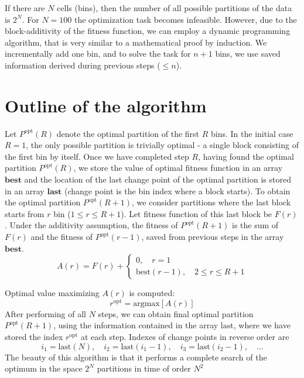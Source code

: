 \documentclass{article}
\begin{document}
If there are $N$ cells (bins), then the number of all possible partitions of the data is $2^N$. For $N=100$ the optimization task becomes infeasible. However, due to the block-additivity of the fitness function, we can employ a dynamic programming algorithm, that is very similar to a mathematical proof by induction. We incrementally add one bin, and to solve the task for $n+1$ bins, we use saved information derived during previous steps ($\le n$). 

\section{Outline of the algorithm}
Let $P^{\text{opt}}(R)$ denote the optimal partition of the first $R$ bins. In the initial case $R=1$, the only possible partition is trivially optimal - a single block consisting of the first bin by itself. Once we have completed step $R$, having found the optimal partition $P^{\text{opt}}(R)$, we store the value of optimal fitness function in an array $\textbf{best}$ and the location of the last change point of the optimal partition is stored in an array $\textbf{last}$ (change point is the bin index where a block starts). To obtain the optimal partition  $P^{\text{opt}}(R+1)$, we consider partitions where the last block starts from  $r$ bin ($1\le r \le R+1$). Let fitness function of this last block be $F(r)$. Under the additivity assumption, the fitness of   $P^{\text{opt}}(R+1)$ is the sum of  $F(r)$ and the fitness of $P^{\text{opt}}(r-1)$, saved from previous steps in the array $\textbf{best}$.
\begin{equation}
    A(r) = F(r) + \begin{cases} 0,\quad r=1\\ \text{best}(r-1), \quad 2\le r\le R+1\end{cases}
\end{equation}

Optimal value maximizing $A(r)$ is computed:
$$ r^{\text{opt}}= \text{argmax}[A(r)] $$
After performing of all $N$ steps, we can obtain final optimal partition $P^{\text{opt}}(R+1)$, using the information contained in the array $\text{last}$, where we have stored the index $r^{\text{opt}}$ at each step. Indexes of change points in reverse order are
\begin{equation}
     i_1=\text{last}(N), \quad i_2=\text{last}(i_1-1), \quad i_3=\text{last}(i_2-1), \quad...
\end{equation}
The beauty of this algorithm is that it performs a complete search of the optimum in the space $2^N$ partitions in time of order $N^2$ 
\end{document}
